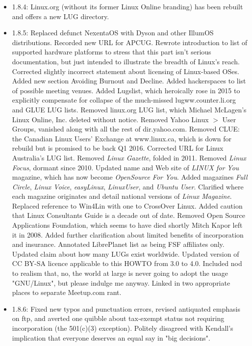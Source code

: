\documentclass{HOWTO}
\begin{document}
\begin{itemize}
\item 1.8.4:  Linux.org (without its former Linux Online branding) has been rebuilt and offers a new LUG directory.
\item 1.8.5:  Replaced defunct NexentaOS with Dyson and other
IllumOS distributions.  Recorded new URL for APCUG.  Rewrote introduction
to list of supported hardware platforms to stress that this part isn't
serious documentation, but just intended to illustrate the breadth of
Linux's reach.  Corrected slightly incorrect statement about licensing of
Linux-based OSes.  Added new section Avoiding Burnout and Decline.
Added hackerspaces to list of possible meeting venues.  Added Lugslist, which
heroically rose in 2015 to explicitly compensate for collapse of the
much-missed lugww.counter.li.org and GLUE LUG lists.  Removed linux.org
LUG list, which Michael McLagen's Linux Online, Inc. deleted without notice.
Removed Yahoo Linux $>$ User Groups, vanished along with all the rest of
dir.yahoo.com.  Removed CLUE: the Canadian Linux Users' Exchange at 
www.linux.ca, which is down for rebuild but is promised to be back Q1
2016.  Corrected URL for Linux Australia's LUG list.  Removed {\itshape Linux
Gazette\/}, folded in 2011.  Removed {\itshape Linux Focus\/}, dormant
since 2010.  Updated name and Web site of {\itshape LINUX for You\/} magazine, which has now become {\itshape OpenSource For You\/}.
Added magazines {\itshape Full Circle\/}, {\itshape Linux Voice\/},
{\itshape easyLinux\/}, {\itshape LinuxUser\/}, and {\itshape Ubuntu User\/}.
Clarified where each magazine originates and detail national versions of
{\itshape Linux Magazine\/}.  Replaced reference to Win4Lin with one to CrossOver
Linux.  Added caution that Linux Consultants Guide is a decade out of
date.  Removed Open Source Applications Foundation, which seems to have
died shortly Mitch Kapor left it in 2008.  Added further clarification 
about limited benefits of incorporation and insurance.  Annotated LibrePlanet 
list as being FSF affiliates only.  Updated claim about how many LUGs 
exist worldwide.  Updated version of CC BY-SA licence applicable to this 
HOWTO from 3.0 to 4.0.  Included nod to realism that, no, the world at large
is never going to adopt the usage "GNU/Linux", but please indulge me anyway.
Linked in two appropriate places to separate Meetup.com rant.
\item 1.8.6:  Fixed new typos and punctuation errors, revised antiquated emphasis on ftp, and averted one quibble about tax-exempt status not requiring incorporation (the 501(c)(3) exception).  Politely disagreed with Kendall's implication that everyone deserves an equal say in "big decisions".

\end{itemize}
\end{document}
